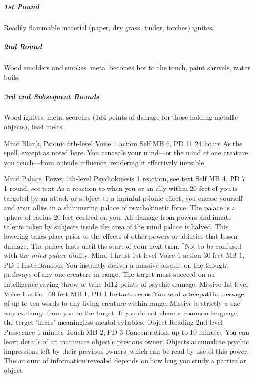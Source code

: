 \subparagraph{1st Round}
  Readily flammable material
  (paper, dry grass, tinder, torches) ignites.
\subparagraph{2nd Round}
  Wood smolders and smokes,
  metal becomes hot to the touch,
  paint shrivels, water boils.
\subparagraph{3rd and Subsequent Rounds}
  Wood ignites, metal scorches
  (1d4 points of damage for those holding metallic objects),
  lead melts.

\DndPowerHeader%
    {Mind Blank, Psionic\label{pwr:mind_blank_psionic}}
    {6th-level Voice}
    {1 action}
    {Self}
    {MB 6, PD 11}
    {24 hours}
As the  spell, except as
noted here. You conceals your mind---or the mind of one creature
you touch---from outside influence, rendering it effectively
invisible.

\DndPowerHeader%
    {Mind Palace, Power\label{pwr:mind_palace_power}}
    {4th-level Psychokinesis}
    {1 reaction, see text}
    {Self}
    {MB 4, PD 7}
    {1 round, see text}
As a reaction to when you or an ally within
20 feet of you is targeted by an attack or subject to a harmful
psionic effect, you encase yourself and your allies in a shimmering
palace of psychokinetic force. The palace is a sphere of radius
20 feet centred on you. All damage from powers and innate
talents taken by subjects inside the area of the mind palace
is halved. This lowering takes place prior to the effects
of other powers or abilities that lessen damage. The palace
lasts until the start of your next turn. $^*$Not to be confused
with the \emph{mind palace} ability.
\DndPowerHeader%
    {Mind Thrust\label{pwr:mind_thrust}}
    {1st-level Voice}
    {1 action}
    {30 feet}
    {MB 1, PD 1}
    {Instantaneous}
You instantly deliver a massive assault on
the thought pathways of any one creature in range. The target
must succeed on an Intelligence saving throw or take 1d12
points of psychic damage.
\DndPowerHeader%
    {Missive\label{pwr:missive}}
    {1st-level Voice}
    {1 action}
    {60 feet}
    {MB 1, PD 1}
    {Instantaneous}
You send a telepathic message of up to ten
words to any living creature within range. Missive is strictly
a one-way exchange from you to the target. If you do not share
a common language, the target `hears' meaningless mental
syllables.
\DndPowerHeader%
    {Object Reading\label{pwr:object_reading}}
    {2nd-level Prescience}
    {1 minute}
    {Touch}
    {MB 2, PD 3}
    {Concentration, up to 10 minutes}
You can learn details of an inanimate object's
previous owner.
Objects accumulate psychic impressions
left by their previous owners,
which can be read by use of this power.
The amount of information revealed depends
on how long you study a particular object.

